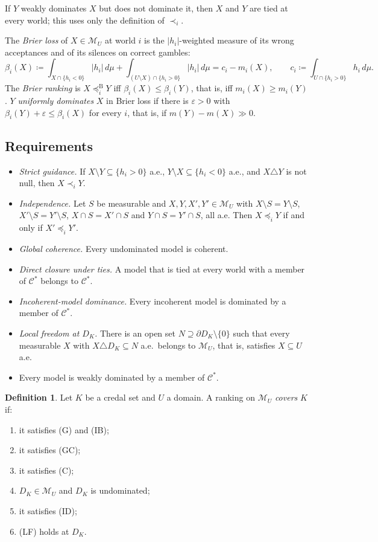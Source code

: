 \documentclass[11pt]{article}
\newcommand{\M}{\mathcal{M}}
\newcommand{\CC}{\mathcal{C}}
\theoremstyle{plain}
\theoremstyle{definition}
\newtheorem{definition}[theorem]{Definition}
\theoremstyle{remark}
\begin{document}
If $Y$ weakly dominates $X$ but does not dominate it, then $X$ and $Y$ are tied at every
world; this uses only the definition of $\prec_i$.

The \emph{Brier loss} of $X\in\M_U$ at world $i$ is the $|h_i|$-weighted measure of its
wrong acceptances and of its silences on correct gambles:
\[
  \beta_i(X)\coloneqq\int_{X\cap\{h_i<0\}}|h_i|\,d\mu
  +\int_{(U\setminus X)\cap\{h_i>0\}}|h_i|\,d\mu=c_i-m_i(X),\qquad
  c_i\coloneqq\int_{U\cap\{h_i>0\}}h_i\,d\mu .
\]
The \emph{Brier ranking} is $X\preceq^{\mathrm B}_iY$ iff $\beta_i(X)\le\beta_i(Y)$, that
is, iff $m_i(X)\ge m_i(Y)$. $Y$ \emph{uniformly dominates} $X$ in Brier loss if there is
$\varepsilon>0$ with $\beta_i(Y)+\varepsilon\le\beta_i(X)$ for every $i$, that is, if
$m(Y)-m(X)\gg0$.

\subsection{Requirements}

\begin{itemize}
  \item[(G)] \emph{Strict guidance.} If $X\setminus Y\subseteq\{h_i>0\}$ a.e.,
  $Y\setminus X\subseteq\{h_i<0\}$ a.e., and $X\triangle Y$ is not null, then
  $X\prec_iY$.
  \item[(IB)] \emph{Independence.} Let $S$ be measurable and $X,Y,X',Y'\in\M_U$ with
  $X\setminus S=Y\setminus S$, $X'\setminus S=Y'\setminus S$, $X\cap S=X'\cap S$ and
  $Y\cap S=Y'\cap S$, all a.e. Then $X\preceq_iY$ if and only if $X'\preceq_iY'$.
  \item[(GC)] \emph{Global coherence.} Every undominated model is coherent.
  \item[(C)] \emph{Direct closure under ties.} A model that is tied at every world with a
  member of $\CC^\ast$ belongs to $\CC^\ast$.
  \item[(ID)] \emph{Incoherent-model dominance.} Every incoherent model is dominated by a
  member of $\CC^\ast$.
  \item[(LF)] \emph{Local freedom at $D_K$.} There is an open set $N\supseteq\partial
  D_K\setminus\{0\}$ such that every measurable $X$ with $X\triangle D_K\subseteq N$ a.e.\
  belongs to $\M_U$, that is, satisfies $X\subseteq U$ a.e.
  \item[(W)] Every model is weakly dominated by a member of $\CC^\ast$.
\end{itemize}

\begin{definition}\label{def:cover}
Let $K$ be a credal set and $U$ a domain. A ranking on $\M_U$ \emph{covers} $K$ if:
\begin{enumerate}[label=(\roman*)]
  \item it satisfies (G) and (IB);
  \item it satisfies (GC);
  \item it satisfies (C);
  \item $D_K\in\M_U$ and $D_K$ is undominated;
  \item it satisfies (ID);
  \item (LF) holds at $D_K$.
\end{enumerate}
\end{definition}
\end{document}

